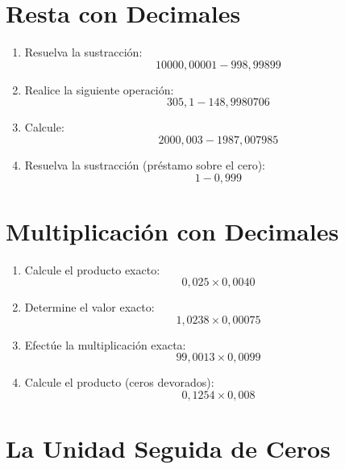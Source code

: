 \documentclass[12pt, letterpaper]{article}
\begin{document}
\newpage

\section{Resta con Decimales}

\begin{enumerate}[leftmargin=*]
  \item Resuelva la sustracción:
        \[
          10000{,}00001 - 998{,}99899
        \]

  \item Realice la siguiente operación:
        \[
          305{,}1 - 148{,}9980706
        \]

  \item Calcule:
        \[
          2000{,}003 - 1987{,}007985
        \]

  \item Resuelva la sustracción (préstamo sobre el cero):
        \[
          1 - 0{,}999
        \]
\end{enumerate}

\newpage

\section{Multiplicación con Decimales}

\begin{enumerate}[leftmargin=*]
  \item Calcule el producto exacto:
        \[
          0{,}025 \times 0{,}0040
        \]

  \item Determine el valor exacto:
        \[
          1{,}0238 \times 0{,}00075
        \]

  \item Efectúe la multiplicación exacta:
        \[
          99{,}0013 \times 0{,}0099
        \]

  \item Calcule el producto (ceros devorados):
        \[
          0{,}1254 \times 0{,}008
        \]
\end{enumerate}

\newpage

\section{La Unidad Seguida de Ceros}
\end{document}
